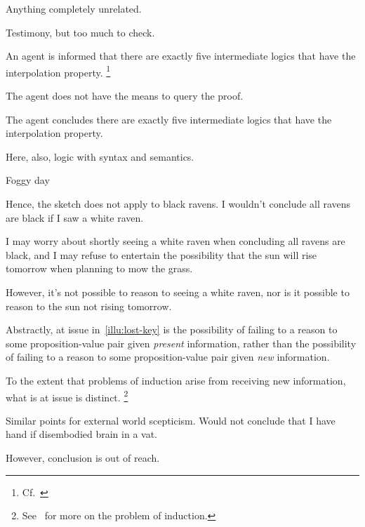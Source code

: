 \begin{note}
  Anything completely unrelated.
\end{note}

\begin{note}
  Testimony, but too much to check.

  \begin{illustration}
    \label{illu:testimony-layperson}
    An agent is informed that there are exactly five intermediate logics that have the interpolation property.\nolinebreak
    \footnote{Cf.\ \textcite{Maksimova:1977un}}

    The agent does not have the means to query the proof.

    The agent concludes there are exactly five intermediate logics that have the interpolation property.
  \end{illustration}

  Here, also, logic with syntax and semantics.
\end{note}

\begin{note}
  Foggy day
\end{note}

\begin{note}
  Hence, the sketch does not apply to black ravens.
  I wouldn't conclude all ravens are black if I saw a white raven.

  I may worry about shortly seeing a white raven when concluding all ravens are black, and I may refuse to entertain the possibility that the sun will rise tomorrow when planning to mow the grass.

  However, it's not possible to reason to seeing a white raven, nor is it possible to reason to the sun not rising tomorrow.

  Abstractly, at issue in~\autoref{illu:lost-key} is the possibility of failing to a reason to some proposition-value pair given \emph{present} information, rather than the possibility of failing to a reason to some proposition-value pair given \emph{new} information.

  To the extent that problems of induction arise from receiving new information, what is at issue is distinct.%
  \footnote{
    See~\textcite{Henderson:2020wb} for more on the problem of induction.
  }

  Similar points for external world scepticism.
  Would not conclude that I have hand if disembodied brain in a vat.

  However, conclusion is out of reach.
\end{note}

